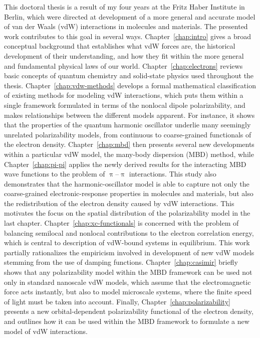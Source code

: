
This doctoral thesis is a result of my four years at the Fritz Haber Institute in Berlin, which were directed at development of a more general and accurate model of van der Waals (vdW) interactions in molecules and materials.
The presented work contributes to this goal in several ways.
Chapter~\ref{chap:intro} gives a broad conceptual background that establishes what vdW forces are, the historical development of their understanding, and how they fit within the more general and fundamental physical laws of our world.
Chapter~\ref{chap:electrons} reviews basic concepts of quantum chemistry and solid-state physics used throughout the thesis.
Chapter~\ref{chap:vdw-methods} develops a formal mathematical classification of existing methods for modeling vdW interactions, which puts them within a single framework formulated in terms of the nonlocal dipole polarizability, and makes relationships between the different models apparent.
For instance, it shows that the properties of the quantum harmonic oscillator underlie many seemingly unrelated polarizability models, from continuous to coarse-grained functionals of the electron density.
Chapter~\ref{chap:mbd} then presents several new developments within a particular vdW model, the many-body dispersion (MBD) method, while Chapter~\ref{chap:pi-pi} applies the newly derived results for the interacting MBD wave functions to the problem of $\uppi$--$\uppi$ interactions.
This study also demonstrates that the harmonic-oscillator model is able to capture not only the coarse-grained electronic-response properties in molecules and materials, but also the redistribution of the electron density caused by vdW interactions.
This motivates the focus on the spatial distribution of the polarizability model in the last chapter.
Chapter~\ref{chap:xc-functionals} is concerned with the problem of balancing semilocal and nonlocal contributions to the electron correlation energy, which is central to description of vdW-bound systems in equilibrium.
This work partially rationalizes the empiricism involved in development of new vdW models stemming from the use of damping functions.
Chapter~\ref{chap:casimir} briefly shows that any polarizability model within the MBD framework can be used not only in standard nanoscale vdW models, which assume that the electromagnetic force acts instantly, but also to model microscale systems, where the finite speed of light must be taken into account.
Finally, Chapter~\ref{chap:polarizability} presents a new orbital-dependent polarizability functional of the electron density, and outlines how it can be used within the MBD framework to formulate a new model of vdW interactions.

